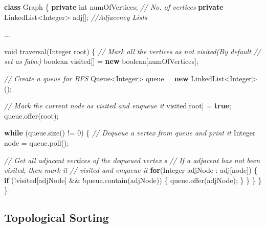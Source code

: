 \documentclass[]{book}
\newenvironment{Shaded}{\begin{snugshade}}{\end{snugshade}}
\newcommand{\BuiltInTok}[1]{#1}
\newcommand{\CommentTok}[1]{\textcolor[rgb]{0.56,0.35,0.01}{\textit{#1}}}
\newcommand{\DataTypeTok}[1]{\textcolor[rgb]{0.13,0.29,0.53}{#1}}
\newcommand{\DecValTok}[1]{\textcolor[rgb]{0.00,0.00,0.81}{#1}}
\newcommand{\FunctionTok}[1]{\textcolor[rgb]{0.00,0.00,0.00}{#1}}
\newcommand{\KeywordTok}[1]{\textcolor[rgb]{0.13,0.29,0.53}{\textbf{#1}}}
\newcommand{\NormalTok}[1]{#1}
\begin{document}
\begin{Shaded}
\begin{Highlighting}[]
\KeywordTok{class}\NormalTok{ Graph  \{}
    \KeywordTok{private} \DataTypeTok{int}\NormalTok{ numOfVertices;   }\CommentTok{// No. of vertices}
    \KeywordTok{private} \BuiltInTok{LinkedList}\NormalTok{<}\BuiltInTok{Integer}\NormalTok{> adj[]; }\CommentTok{//Adjacency Lists}

\NormalTok{    ...}

    \DataTypeTok{void} \FunctionTok{traversal}\NormalTok{(}\BuiltInTok{Integer}\NormalTok{ root)  \{}
        \CommentTok{// Mark all the vertices as not visited(By default}
        \CommentTok{// set as false)}
        \DataTypeTok{boolean}\NormalTok{ visited[] = }\KeywordTok{new} \DataTypeTok{boolean}\NormalTok{[numOfVertices];}

        \CommentTok{// Create a queue for BFS}
        \BuiltInTok{Queue}\NormalTok{<}\BuiltInTok{Integer}\NormalTok{> queue = }\KeywordTok{new} \BuiltInTok{LinkedList}\NormalTok{<}\BuiltInTok{Integer}\NormalTok{>();}

        \CommentTok{// Mark the current node as visited and enqueue it}
\NormalTok{        visited[root] = }\KeywordTok{true}\NormalTok{;}
\NormalTok{        queue.}\FunctionTok{offer}\NormalTok{(root);}

        \KeywordTok{while}\NormalTok{ (queue.}\FunctionTok{size}\NormalTok{() != }\DecValTok{0}\NormalTok{) \{}
            \CommentTok{// Dequeue a vertex from queue and print it}
            \BuiltInTok{Integer}\NormalTok{ node = queue.}\FunctionTok{poll}\NormalTok{();}

            \CommentTok{// Get all adjacent vertices of the dequeued vertex s}
            \CommentTok{// If a adjacent has not been visited, then mark it}
            \CommentTok{// visited and enqueue it}
            \KeywordTok{for}\NormalTok{(}\BuiltInTok{Integer}\NormalTok{ adjNode : adj[node]) \{}
                \KeywordTok{if}\NormalTok{ (!visited[adjNode] && !queue.}\FunctionTok{contain}\NormalTok{(adjNode)) \{}
\NormalTok{                    queue.}\FunctionTok{offer}\NormalTok{(adjNode);}
\NormalTok{                \}}
\NormalTok{            \}}
\NormalTok{        \}}
\NormalTok{    \}}
\NormalTok{\}}
\end{Highlighting}
\end{Shaded}

\hypertarget{topological-sorting}{%
\subsection{Topological Sorting}\label{topological-sorting}}
\end{document}
